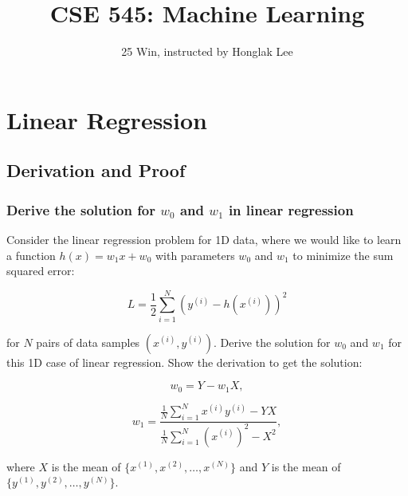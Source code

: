 \documentclass[lang=cn,11pt]{elegantbook}
\title{CSE 545: Machine Learning}
\subtitle{25 Win, instructed by Honglak Lee}
\begin{document}
\frontmatter
\tableofcontents
\mainmatter

\chapter{Linear Regression}
\section{Derivation and Proof}

\subsection{Derive the solution for \(w_0\) and \(w_1\) in linear regression}
Consider the linear regression problem for 1D data, where we would like to learn a function \(h(x) = w_1x + w_0\) with parameters \(w_0\) and \(w_1\) to minimize the sum squared error:

\[
L = \frac{1}{2} \sum_{i=1}^{N} (y^{(i)} - h(x^{(i)}))^2
\]

for \(N\) pairs of data samples \((x^{(i)}, y^{(i)})\). Derive the solution for \(w_0\) and \(w_1\) for this 1D case of linear regression. Show the derivation to get the solution:

\[
w_0 = Y - w_1X,
\]

\[
w_1 = \frac{\frac{1}{N} \sum_{i=1}^{N} x^{(i)} y^{(i)} - YX}{\frac{1}{N} \sum_{i=1}^{N} (x^{(i)})^2 - X^2},
\]

where \(X\) is the mean of \(\{x^{(1)}, x^{(2)}, \ldots, x^{(N)}\}\) and \(Y\) is the mean of \(\{y^{(1)}, y^{(2)}, \ldots, y^{(N)}\}\).
\end{document}
